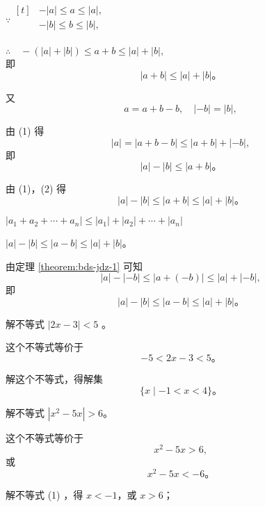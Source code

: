 \zhengming \; $\because \begin{aligned}[t]
    & -|a| \leqslant a \leqslant |a|, \\
    & -|b| \leqslant b \leqslant |b|, \\
\end{aligned}$

$\therefore \quad -(|a| + |b|) \leqslant a + b \leqslant |a| + |b|,$\\
即
\begin{equation*}
    |a + b| \leqslant |a| + |b| \text{。} \tag{1}
\end{equation*}

又
$$ a = a + b - b, \quad |-b| = |b|, $$

由 (1) 得
$$ |a| = |a + b - b| \leqslant |a + b| + |-b|, $$
即
\begin{equation*}
    |a| - |b| \leqslant |a + b| \text{。} \tag{2}
\end{equation*}

由 (1)，(2) 得
$$ |a| - |b| \leqslant |a + b| \leqslant |a| + |b| \text{。} $$

\begin{corollary} \label{corollary:bds-jdz-1-1}
    $|a_1 + a_2 + \cdots + a_n| \leqslant |a_1| + |a_2| + \cdots + |a_n|$
\end{corollary}


\begin{theorem} \label{theorem:bds-jdz-2}
    $|a| - |b| \leqslant |a - b| \leqslant |a| + |b|$。
\end{theorem}

\zhengming 由定理 \ref{theorem:bds-jdz-1} 可知
$$ |a| - |-b| \leqslant |a + (-b)| \leqslant |a| + |-b|,$$
即
$$ |a| - |b| \leqslant |a - b| \leqslant |a| + |b| \text{。} $$


\liti 解不等式 $|2x - 3| < 5$ 。

\jie 这个不等式等价于
$$ -5 < 2x - 3 < 5 \text{。} $$

解这个不等式，得解集
$$ \{ x \mid -1 < x < 4 \} \text{。} $$


\liti 解不等式 $|x^2 - 5x| > 6$。

\jie 这个不等式等价于
\begin{equation*}
    x^2 - 5x > 6, \tag{1}
\end{equation*}
或
\begin{equation*}
    x^2 - 5x < -6 \text{。} \tag{2}
\end{equation*}

解不等式 (1) ，得 $x < -1$，或 $x > 6$；

